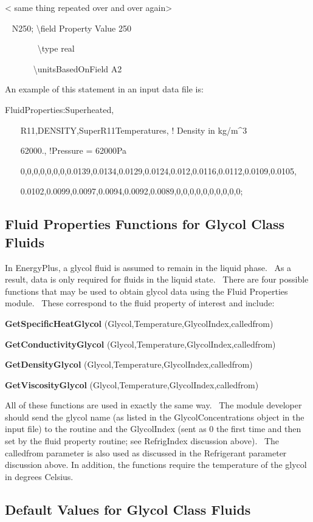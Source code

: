 \textless{} same thing repeated over and over again\textgreater{}

~ N250; \textbackslash{}field Property Value 250

~~~~~~~ \textbackslash{}type real

~~~~~~ \textbackslash{}unitsBasedOnField A2

An example of this statement in an input data file is:

FluidProperties:Superheated,

~~~ R11,DENSITY,SuperR11Temperatures, ! Density in kg/m\^{}3

~~~ 62000., !Pressure = 62000Pa

~~~ 0,0,0,0,0,0,0,0.0139,0.0134,0.0129,0.0124,0.012,0.0116,0.0112,0.0109,0.0105,

~~~ 0.0102,0.0099,0.0097,0.0094,0.0092,0.0089,0,0,0,0,0,0,0,0,0,0;

\subsection{Fluid Properties Functions for Glycol Class Fluids}\label{fluid-properties-functions-for-glycol-class-fluids}

In EnergyPlus, a glycol fluid is assumed to remain in the liquid phase.~ As a result, data is only required for fluids in the liquid state.~ There are four possible functions that may be used to obtain glycol data using the Fluid Properties module.~ These correspond to the fluid property of interest and include:

\textbf{GetSpecificHeatGlycol} (Glycol,Temperature,GlycolIndex,calledfrom)

\textbf{GetConductivityGlycol} (Glycol,Temperature,GlycolIndex,calledfrom)

\textbf{GetDensityGlycol} (Glycol,Temperature,GlycolIndex,calledfrom)

\textbf{GetViscosityGlycol} (Glycol,Temperature,GlycolIndex,calledfrom)

All of these functions are used in exactly the same way.~ The module developer should send the glycol name (as listed in the GlycolConcentrations object in the input file) to the routine and the GlycolIndex (sent as 0 the first time and then set by the fluid property routine; see RefrigIndex discussion above).~ The calledfrom parameter is also used as discussed in the Refrigerant parameter discussion above. In addition, the functions require the temperature of the glycol in degrees Celsius.

\subsection{Default Values for Glycol Class Fluids}\label{default-values-for-glycol-class-fluids}

